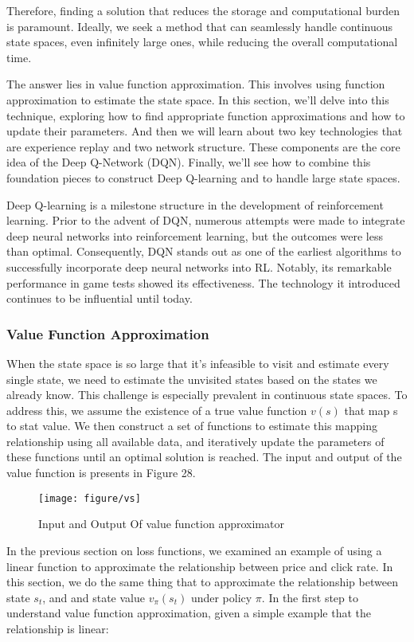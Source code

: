 \documentclass{article}
\begin{document}
Therefore, finding a solution that reduces the storage and computational burden is paramount. Ideally, we seek a method that can seamlessly handle continuous state spaces, even infinitely large ones, while reducing the overall computational time.

The answer lies in value function approximation. This involves using function approximation to estimate the state space. In this section, we'll delve into this technique, exploring how to find appropriate function approximations and how to update their parameters. And then we will learn about two key technologies that are experience replay and two network structure. These components are the core idea of the Deep Q-Network (DQN). Finally, we'll see how to combine this foundation pieces to construct Deep Q-learning and to handle large state spaces.

Deep Q-learning is a milestone structure in the development of reinforcement learning. Prior to the advent of DQN, numerous attempts were made to integrate deep neural networks into reinforcement learning, but the outcomes were less than optimal. Consequently, DQN stands out as one of the earliest algorithms to successfully incorporate deep neural networks into RL. Notably, its remarkable performance in game tests showed its effectiveness. The technology it introduced continues to be influential until today.

\newpage
\subsubsection{Value Function Approximation}
When the state space is so large that it's infeasible to visit and estimate every single state, we need to estimate the unvisited states based on the states we already know. This challenge is especially prevalent in continuous state spaces. To address this, we assume the existence of a true value function $v(s)$ that map s to stat value. We then construct a set of functions to estimate this mapping relationship using all available data, and iteratively update the parameters of these functions until an optimal solution is reached. The input and output of the value function is presents in Figure 28.

\begin{figure}[htbp]
        \centering
        \texttt{[image: figure/vs]}
        \caption{Input and Output Of value function approximator}
\end{figure}

In the previous section on loss functions, we examined an example of using a linear function to approximate the relationship between price and click rate. In this section, we do the same thing that to approximate the relationship between state $s_t$, and and state value $v_{\pi}(s_t)$ under policy $\pi$. In the first step to understand value function approximation, given a simple example that the relationship is linear:
\end{document}
